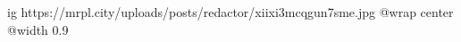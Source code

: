 
 
 
 
 

\ifcmt
  ig https://mrpl.city/uploads/posts/redactor/xiixi3mcqgun7sme.jpg
  @wrap center
  @width 0.9
\fi

